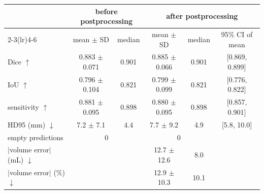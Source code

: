 \begin{tabular}{lccccc}
\toprule
 & \multicolumn{2}{c}{before postprocessing} & \multicolumn{3}{c}{after postprocessing} \\
\cmidrule(lr){2-3}\cmidrule(lr){4-6}
 & mean $\pm$ SD & median & mean $\pm$ SD & median & 95\% CI of mean \\
\midrule
Dice $\uparrow$ & 0.883 $\pm$ 0.071 & 0.901 & 0.885 $\pm$ 0.066 & 0.901 & [0.869, 0.899] \\
IoU $\uparrow$ & 0.796 $\pm$ 0.104 & 0.821 & 0.799 $\pm$ 0.099 & 0.821 & [0.776, 0.822] \\
sensitivity $\uparrow$ & 0.881 $\pm$ 0.095 & 0.898 & 0.880 $\pm$ 0.095 & 0.898 & [0.857, 0.901] \\
HD95 (mm) $\downarrow$ & 7.2 $\pm$ 7.1 & 4.4 & 7.7 $\pm$ 9.2 & 4.9 & [5.8, 10.0] \\
empty predictions & \multicolumn{2}{c}{0} & \multicolumn{2}{c}{0} & \\
\midrule
$|$volume error$|$ (mL) $\downarrow$ & & & 12.7 $\pm$ 12.6 & 8.0 & \\
$|$volume error$|$ (\%) $\downarrow$ & & & 12.9 $\pm$ 10.3 & 10.1 & \\
\bottomrule
\end{tabular}